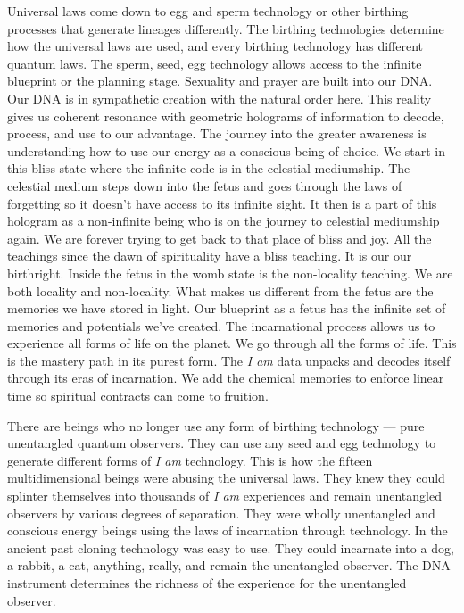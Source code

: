 \documentclass[letterpaper,11pt,twoside,titlepage,onecolumn,openany]{book}
\begin{document}
Universal laws come down to egg and sperm technology or other birthing
processes that generate lineages differently. The birthing technologies
determine how the universal laws are used, and every birthing technology
has different quantum laws. The sperm, seed, egg technology allows
access to the infinite blueprint or the planning stage. Sexuality and
prayer are built into our DNA. Our DNA is in sympathetic creation with
the natural order here. This reality gives us coherent resonance with
geometric holograms of information to decode, process, and use to our
advantage. The journey into the greater awareness is understanding how
to use our energy as a conscious being of choice. We start in this bliss
state where the infinite code is in the celestial mediumship. The
celestial medium steps down into the fetus and goes through the laws of
forgetting so it doesn't have access to its infinite sight. It then is a
part of this hologram as a non-infinite being who is on the journey to
celestial mediumship again. We are forever trying to get back to that
place of bliss and joy. All the teachings since the dawn of spirituality
have a bliss teaching. It is our our birthright. Inside the fetus in the
womb state is the non-locality teaching. We are both locality and
non-locality. What makes us different from the fetus are the memories we
have stored in light. Our blueprint as a fetus has the infinite set of
memories and potentials we've created. The incarnational process allows
us to experience all forms of life on the planet. We go through all the
forms of life. This is the mastery path in its purest form. The \emph{I
am} data unpacks and decodes itself through its eras of incarnation. We
add the chemical memories to enforce linear time so spiritual contracts
can come to fruition.

There are beings who no longer use any form of birthing technology ---
pure unentangled quantum observers. They can use any seed and egg
technology to generate different forms of \emph{I am} technology. This
is how the fifteen multidimensional beings were abusing the universal
laws. They knew they could splinter themselves into thousands of \emph{I
am} experiences and remain unentangled observers by various degrees of
separation. They were wholly unentangled and conscious energy beings
using the laws of incarnation through technology. In the ancient past
cloning technology was easy to use. They could incarnate into a dog, a
rabbit, a cat, anything, really, and remain the unentangled observer.
The DNA instrument determines the richness of the experience for the
unentangled observer.
\end{document}
